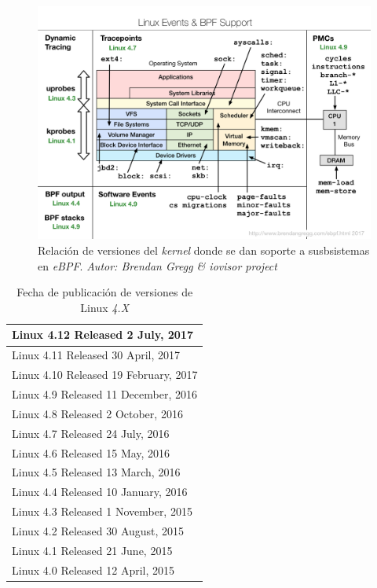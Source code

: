 \begin{figure}[h]
  \centering
    \includegraphics[scale=0.65]{images/linux_ebpf_support}
  \caption{Relación de versiones del \emph{kernel} donde se dan soporte a susbsistemas en \emph{eBPF}. \emph{Autor: Brendan Gregg \& iovisor project}}
  \label{fig:linux_ebpf_support}
\end{figure}

\begin{table}[h]
\centering
\begin{tabular}[!h]{|l|}
\hline
Linux 4.12 Released 2 July, 2017 \\
\hline
Linux 4.11 Released 30 April, 2017 \\
\hline
Linux 4.10 Released 19 February, 2017 \\
\hline
Linux 4.9 Released 11 December, 2016 \\
\hline
Linux 4.8 Released 2 October, 2016 \\
\hline
Linux 4.7 Released 24 July, 2016 \\
\hline
Linux 4.6 Released 15 May, 2016 \\
\hline
Linux 4.5 Released 13 March, 2016 \\
\hline
Linux 4.4 Released 10 January, 2016 \\
\hline
Linux 4.3 Released 1 November, 2015 \\
\hline
Linux 4.2 Released 30 August, 2015 \\
\hline
Linux 4.1 Released 21 June, 2015 \\
\hline
Linux 4.0 Released 12 April, 2015 \\
\hline
\end{tabular}
\caption{\label{tab:linux-release-date}Fecha de publicación de versiones de Linux \emph{4.X}}
\end{table}

